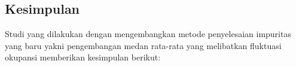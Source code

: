 \chapter{\babLima}

\section{Kesimpulan}

Studi yang dilakukan dengan mengembangkan metode penyelesaian impuritas yang baru yakni pengembangan medan rata-rata yang melibatkan fluktuasi okupansi memberikan kesimpulan berikut:

